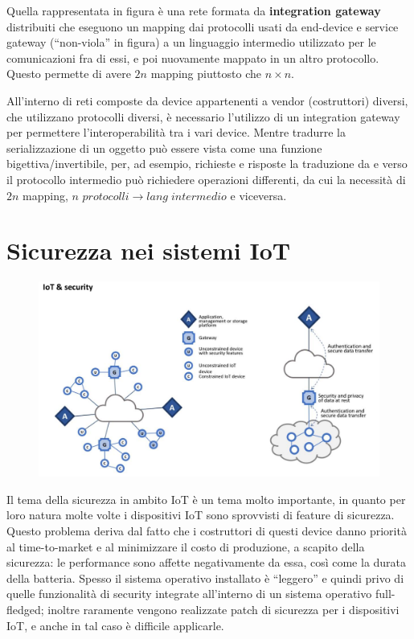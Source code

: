 Quella rappresentata in figura è una rete formata da \textbf{integration gateway} distribuiti che eseguono un mapping dai protocolli usati da end-device e service gateway (``non-viola'' in figura) a un linguaggio intermedio utilizzato per le comunicazioni fra di essi, e poi nuovamente mappato in un altro protocollo.
Questo permette di avere $2n$ mapping piuttosto che $n\times n$.

All'interno di reti composte da device appartenenti a vendor (costruttori) diversi, che utilizzano protocolli diversi, è necessario l'utilizzo di un integration gateway per permettere l'interoperabilità tra i vari device.
Mentre tradurre la serializzazione di un oggetto può essere vista come una funzione bigettiva/invertibile, per, ad esempio, richieste e risposte la traduzione da e verso il protocollo intermedio può richiedere operazioni differenti, da cui la necessità di $2n$ mapping, $\textit{n protocolli} \longrightarrow {lang\;intermedio}$ e viceversa.

\section{Sicurezza nei sistemi IoT}

\begin{figure}[htbp]
   \centering
   \includegraphics{images/questions/Schermata del 2023-10-16 18-20-38.png}
   \label{fig:dom2}
\end{figure}
Il tema della sicurezza in ambito IoT è un tema molto importante, in quanto per loro natura molte volte i dispositivi IoT sono sprovvisti di feature di sicurezza. Questo problema deriva dal fatto che i costruttori di questi device  danno priorità al time-to-market e al minimizzare il costo di produzione, a scapito della sicurezza:
le performance sono affette negativamente da essa, così come la durata della batteria. Spesso il sistema operativo installato è ``leggero'' e quindi privo di quelle funzionalità di security integrate all'interno di un sistema operativo full-fledged;
inoltre raramente vengono realizzate patch di sicurezza per i dispositivi IoT, e anche in tal caso è difficile applicarle. 

